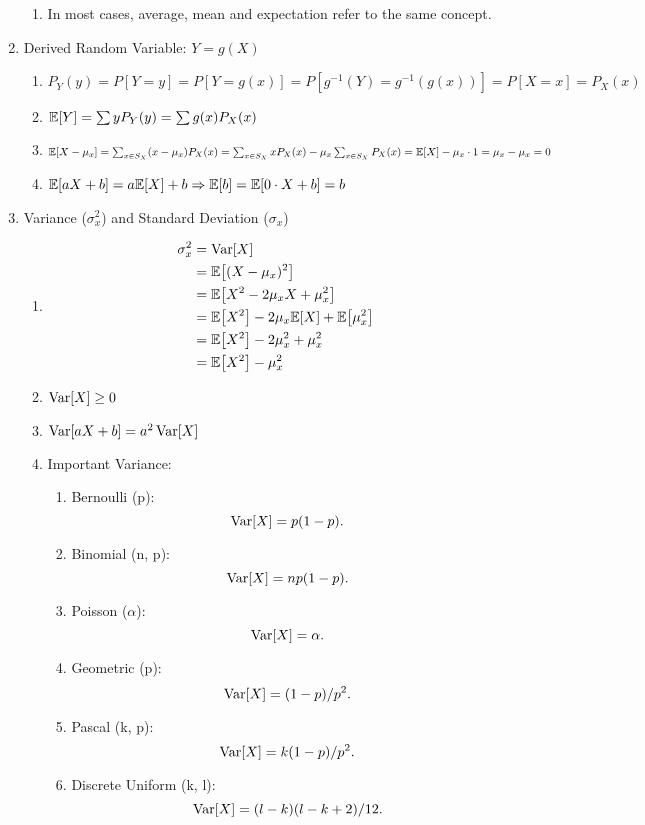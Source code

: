 \begin{enumerate}
{\begin{enumerate}
            \item In most cases, average, mean and expectation refer to the same concept.
        \end{enumerate}
    }
    \item Derived Random Variable: $Y = g(X)${
        \begin{enumerate}
            \item $P_Y(y) = P[Y=y] = P[Y=g(x)] = P[g^{-1}(Y)=g^{-1}(g(x))] = P[X=x] = P_X(x)$
            \item $\E{Y} = \sum yP_Y(y) = \sum g(x)P_X(x)$
            \item $\E{X-\mu_x}=\sum_{x\in S_X}(x-\mu_x)P_X(x)=\sum_{x\in S_X}xP_X(x)-\mu_x\sum_{x\in S_X}P_X(x)=\E{X}-\mu_x\cdot 1=\mu_x-\mu_x=0$
            \item $\E{aX+b}=a\E{X}+b \Rightarrow \E{b}=\E{0\cdot X+b}=b$
        \end{enumerate}
    }
    \item Variance ($\sigma_x^2$) and Standard Deviation ($\sigma_x$){
        \begin{enumerate}
            \item {
                \begin{align*}
                    \sigma_x^2
                    &= \Var[X] \\
                    &= \E{(X-\mu_x)^2} \\
                    &= \E{X^2-2\mu_x X+\mu_x^2} \\
                    &= \E{X^2}-2\mu_x\E{X}+\E{\mu_x^2} \\
                    &= \E{X^2}-2\mu_x^2+\mu_x^2 \\
                    &= \E{X^2}-\mu_x^2
                \end{align*}
            }
            \item $\mathop{\mathrm{Var}}\nolimits[X]\geq 0$
            \item $\mathop{\mathrm{Var}}\nolimits[aX+b]=a^2\mathop{\mathrm{Var}}\nolimits[X]$
            \item Important Variance:{
                \begin{enumerate}
                    \item Bernoulli (p): \[\mathop{\mathrm{Var}}\nolimits[X]=p(1-p).\]
                    \item Binomial (n, p): \[\mathop{\mathrm{Var}}\nolimits[X]=np(1-p).\]
                    \item Poisson ($\alpha$): \[\mathop{\mathrm{Var}}\nolimits[X]=\alpha.\]
                    \item Geometric (p): \[\mathop{\mathrm{Var}}\nolimits[X]=(1-p)/p^2.\]
                    \item Pascal (k, p): \[\mathop{\mathrm{Var}}\nolimits[X]=k(1-p)/p^2.\]
                    \item Discrete Uniform (k, l): \[\mathop{\mathrm{Var}}\nolimits[X]=(l-k)(l-k+2)/12.\]
                \end{enumerate}
            }
        \end{enumerate}
    }
\end{enumerate}